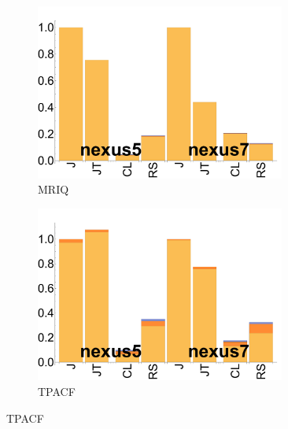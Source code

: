\begin{figure}
  \begin{subfigure}[b]{0.23\textwidth}
      \centering
      \includegraphics[width=0.9\textwidth]{data/bbattery_mriq.pdf}
      \caption{MRIQ}
  \end{subfigure}
  \begin{subfigure}[b]{0.23\textwidth}
      \centering
      \includegraphics[width=0.9\textwidth]{data/bbattery_tpacf.pdf}
      \caption{TPACF}
  \end{subfigure}%


\end{figure}

